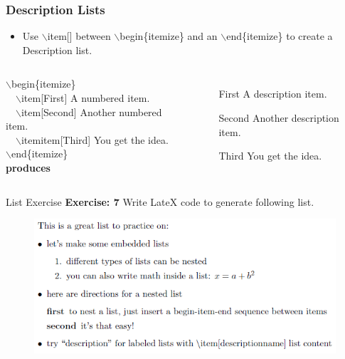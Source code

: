 \documentclass [9pt] {beamer}
\begin{document}
\begin{frame}\frametitle{Description Lists}
\rm
\fontsize{9pt}{11pt}\selectfont
\begin{itemize}
\item Use \textcolor[rgb]{0.98,0.00,0.00}{$\backslash$item[]} between \textcolor[rgb]{0.98,0.00,0.00}{$\backslash$begin\{itemize\}} and an \textcolor[rgb]{0.98,0.00,0.00}{$\backslash$end\{itemize\}} to create a Description list.\\[.20cm]
\end{itemize}
\begin{columns}[t]
\textcolor[rgb]{0.98,0.00,0.00}{$\backslash$begin\{itemize\}}\\
\ \ $\backslash$item[First] A numbered item.\\
\ \ $\backslash$item[Second] Another numbered item.\\
\ \ $\backslash$itemitem[Third] You get the idea.\\
\textcolor[rgb]{0.98,0.00,0.00}{$\backslash$end\{itemize\}}\\[.20cm]
\textbf{produces}\\[.20cm]
%
\begin{itemize}
\item[First] A description item.
\item[Second] Another description item.
\item[Third] You get the idea.
\end{itemize}
\end{columns}
\end{frame}

\begin{frame}{List Exercise}
\textbf{Exercise: 7} Write LateX code to generate following list.

\begin{figure}
	\centering
	\includegraphics[width=\linewidth]{Ex_list}
\end{figure}

\end{frame}
\end{document}

